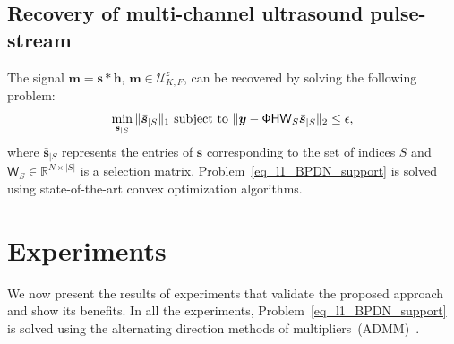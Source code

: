 \documentclass{article}
\newcommand{\vect}[1]{\bm{#1}}
\newcommand{\mat}[1]{\mathsf{#1}}
\theoremstyle{definition}
\begin{document}
\subsection{Recovery of multi-channel ultrasound pulse-stream}
\label{subsec_sampling_pulse_stream}
The signal $\vect{m} = \vect{s} \ast \vect{h}$, $\vect{m} \in \mathcal{U}^z_{K,F}$, can be recovered by solving the following problem:
\begin{equation}
\label{eq_l1_BPDN_support}
\min_{\bar{\vect{s}}_{|S}}\|\bar{\vect{s}}_{|S}\|_{1}
\textnormal{ subject to }\| \bm{y}-\mat{\Phi H W}_S\bar{\vect{s}}_{|S}\|_{2}\leq\epsilon,
\end{equation}
where $\bar{\vect{s}}_{|S}$ represents the entries of $\vect{s}$ corresponding to the set of indices $S$ and $\mat{W}_S \in \mathbb{R}^{N \times |S|}$ is a selection matrix. 
Problem~\eqref{eq_l1_BPDN_support} is solved using state-of-the-art convex optimization algorithms.
\section{Experiments}
\label{sec_exp}
We now present the results of experiments that validate the proposed approach and show its benefits.
In all the experiments, Problem~\eqref{eq_l1_BPDN_support} is solved using the alternating direction methods of multipliers~(ADMM)~\cite{Boyd2010}.
\end{document}
